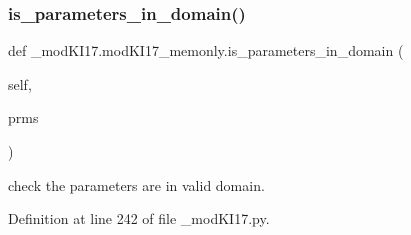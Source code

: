 \subsubsection{\texorpdfstring{is\+\_\+parameters\+\_\+in\+\_\+domain()}{is\_parameters\_in\_domain()}}
{\footnotesize\ttfamily def \+\_\+mod\+K\+I17.\+mod\+K\+I17\+\_\+memonly.\+is\+\_\+parameters\+\_\+in\+\_\+domain (\begin{DoxyParamCaption}\item[{}]{self,  }\item[{}]{prms }\end{DoxyParamCaption})}

\begin{DoxyVerb}check the parameters are in valid domain.
\end{DoxyVerb}
 

Definition at line 242 of file \+\_\+mod\+K\+I17.\+py.


